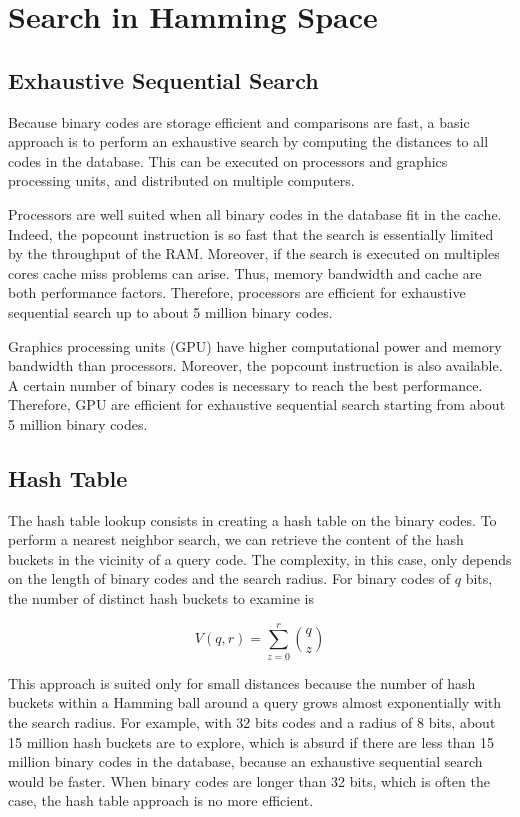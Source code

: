 \chapter{Search in Hamming Space}

\label{chapter:SearchHammingSpace}


\section{Exhaustive Sequential Search}
Because binary codes are storage efficient and comparisons are fast, a basic approach is to perform an exhaustive search by computing the distances to all codes in the database. This can be executed on processors and graphics processing units, and distributed on multiple computers.

Processors are well suited when all binary codes in the database fit in the cache. Indeed, the popcount instruction is so fast that the search is essentially limited by the throughput of the RAM. Moreover, if the search is executed on multiples cores cache miss problems can arise. Thus, memory bandwidth and cache are both performance factors. Therefore, processors are efficient for exhaustive sequential search up to about 5 million binary codes.

Graphics processing units (GPU) have higher computational power and memory bandwidth than processors. Moreover, the popcount instruction is also available. A certain number of binary codes is necessary to reach the best performance. Therefore, GPU are efficient for exhaustive sequential search starting from about 5 million binary codes.

\section{Hash Table}
The hash table lookup consists in creating a hash table on the binary codes. To perform a nearest neighbor search, we can retrieve the content of the hash buckets in the vicinity of a query code. The complexity, in this case, only depends on the length of binary codes and the search radius. For binary codes of $q$ bits, the number of distinct hash buckets to examine is \cite{norouzi2016}

\[V(q,r)=\sum\limits_{z=0}^r \binom{q}{z}\]

This approach is suited only for small distances because the number of hash buckets within a Hamming ball around a query grows almost exponentially with the search radius. For example, with 32 bits codes and a radius of 8 bits, about 15 million hash buckets are to explore, which is absurd if there are less than 15 million binary codes in the database, because an exhaustive sequential search would be faster. When binary codes are longer than 32 bits, which is often the case, the hash table approach is no more efficient.

